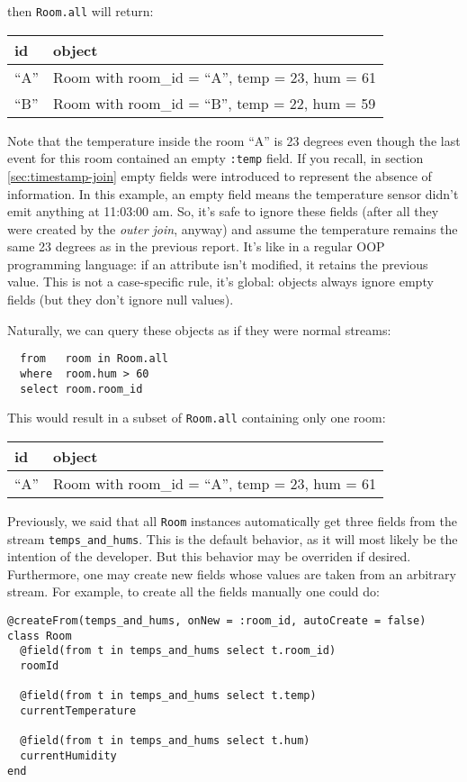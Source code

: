 \documentclass{report}
\begin{document}
then \verb=Room.all= will return:

\begin{tabular}{ |l|l| }
  \hline
  id & object \\
  \hline
  ``A'' & Room with room\_id = ``A'', temp = 23, hum = 61 \\
  ``B'' & Room with room\_id = ``B'', temp = 22, hum = 59 \\
  \hline
\end{tabular}

Note that the temperature inside the room ``A'' is 23 degrees even
though the last event for this room contained an empty \verb=:temp=
field. If you recall, in section \ref{sec:timestamp-join} empty fields
were introduced to represent the absence of information. In this
example, an empty field means the temperature sensor didn't emit
anything at 11:03:00 am. So, it's safe to ignore these fields (after
all they were created by the \emph{outer join}, anyway) and assume the
temperature remains the same 23 degrees as in the previous
report. It's like in a regular OOP programming language: if an
attribute isn't modified, it retains the previous value. This is not a
case-specific rule, it's global: objects always ignore empty fields
(but they don't ignore null values).

Naturally, we can query these objects as if they were normal streams:

\begin{verbatim}
  from   room in Room.all
  where  room.hum > 60
  select room.room_id
\end{verbatim}

This would result in a subset of \verb=Room.all= containing only one
room:

\begin{tabular}{ |l|l| }
  \hline
  id & object \\
  \hline
  ``A'' & Room with room\_id = ``A'', temp = 23, hum = 61 \\
  \hline
\end{tabular}

Previously, we said that all \verb=Room= instances automatically get
three fields from the stream \verb=temps_and_hums=. This is the
default behavior, as it will most likely be the intention of the
developer. But this behavior may be overriden if desired. Furthermore,
one may create new fields whose values are taken from an arbitrary
stream. For example, to create all the fields manually one could do:

\begin{verbatim}
@createFrom(temps_and_hums, onNew = :room_id, autoCreate = false)
class Room
  @field(from t in temps_and_hums select t.room_id)
  roomId

  @field(from t in temps_and_hums select t.temp)
  currentTemperature

  @field(from t in temps_and_hums select t.hum)
  currentHumidity
end
\end{verbatim}
\end{document}

